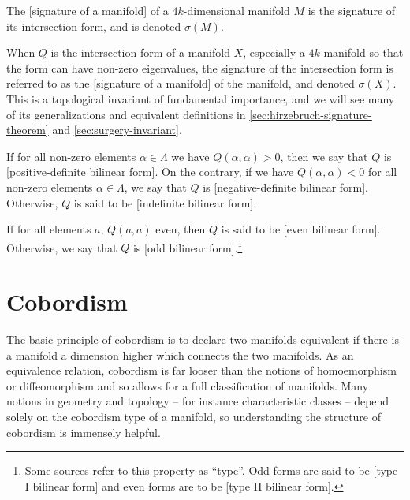 \begin{definition}
	The [signature of a manifold] of a $4k$-dimensional manifold $M$ is the signature of its intersection form, and is denoted $\sigma(M)$.
\end{definition}

When $Q$ is the intersection form of a manifold $X$, especially a $4k$-manifold so that the form can have non-zero eigenvalues, the signature of the intersection form is referred to as the [signature of a manifold] of the manifold, and denoted $\sigma(X)$. This is a topological invariant of fundamental importance, and we will see many of its generalizations and equivalent definitions in \cref{sec:hirzebruch-signature-theorem} and \cref{sec:surgery-invariant}.

\begin{definition}
	If for all non-zero elements $\alpha\in \Lambda$ we have $Q(\alpha,\alpha)>0$, then we say that $Q$ is [positive-definite bilinear form]. On the contrary, if we have $Q(\alpha,\alpha)<0$ for all non-zero elements $\alpha\in \Lambda$, we say that $Q$ is [negative-definite bilinear form]. Otherwise, $Q$ is said to be [indefinite bilinear form].
\end{definition}

\begin{definition}
	If for all elements $a$, $Q(a,a)$ even, then $Q$ is said to be [even bilinear form]. Otherwise, we say that $Q$ is [odd bilinear form].\footnote{Some sources refer to this property as ``type''. Odd forms are said to be [type I bilinear form] and even forms are to be [type II bilinear form].}
\end{definition}



\medskip
{}

\pagebreak
\section{Cobordism}\label{sec:cobordism}

The basic principle of cobordism is to declare two manifolds equivalent if there is a manifold a dimension higher which connects the two manifolds. As an equivalence relation, cobordism is far looser than the notions of homoemorphism or diffeomorphism and so allows for a full classification of manifolds. Many notions in geometry and topology -- for instance characteristic classes -- depend solely on the cobordism type of a manifold, so understanding the structure of cobordism is immensely helpful.

